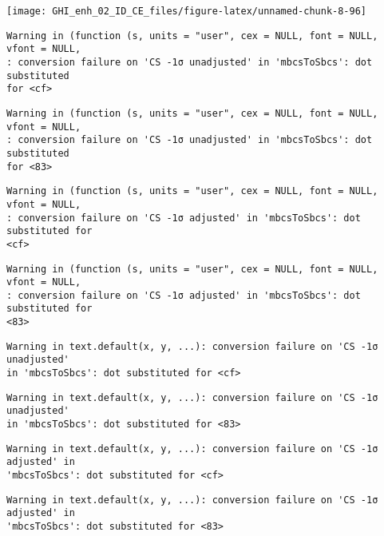 \documentclass[
  10pt,
  a4paper,oneside]{article}
\begin{document}
\begin{center}\texttt{[image: GHI\_enh\_02\_ID\_CE\_files/figure-latex/unnamed-chunk-8-96]} \end{center}

\begin{verbatim}
Warning in (function (s, units = "user", cex = NULL, font = NULL, vfont = NULL,
: conversion failure on 'CS -1σ unadjusted' in 'mbcsToSbcs': dot substituted
for <cf>
\end{verbatim}

\begin{verbatim}
Warning in (function (s, units = "user", cex = NULL, font = NULL, vfont = NULL,
: conversion failure on 'CS -1σ unadjusted' in 'mbcsToSbcs': dot substituted
for <83>
\end{verbatim}

\begin{verbatim}
Warning in (function (s, units = "user", cex = NULL, font = NULL, vfont = NULL,
: conversion failure on 'CS -1σ adjusted' in 'mbcsToSbcs': dot substituted for
<cf>
\end{verbatim}

\begin{verbatim}
Warning in (function (s, units = "user", cex = NULL, font = NULL, vfont = NULL,
: conversion failure on 'CS -1σ adjusted' in 'mbcsToSbcs': dot substituted for
<83>
\end{verbatim}

\begin{verbatim}
Warning in text.default(x, y, ...): conversion failure on 'CS -1σ unadjusted'
in 'mbcsToSbcs': dot substituted for <cf>
\end{verbatim}

\begin{verbatim}
Warning in text.default(x, y, ...): conversion failure on 'CS -1σ unadjusted'
in 'mbcsToSbcs': dot substituted for <83>
\end{verbatim}

\begin{verbatim}
Warning in text.default(x, y, ...): conversion failure on 'CS -1σ adjusted' in
'mbcsToSbcs': dot substituted for <cf>
\end{verbatim}

\begin{verbatim}
Warning in text.default(x, y, ...): conversion failure on 'CS -1σ adjusted' in
'mbcsToSbcs': dot substituted for <83>
\end{verbatim}
\end{document}
